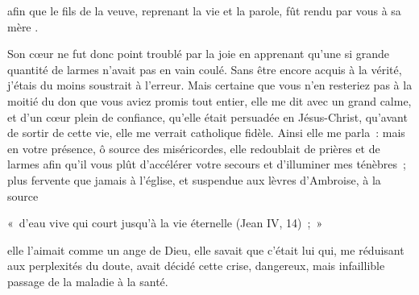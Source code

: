 \documentclass[french,twoside]{book} %
\newenvironment{quoteblock}%
  {\begin{quoting}}
  {\end{quoting}}
\newenvironment{quotebar}{%
    \def\FrameCommand{{\color{rubric!10!}\vrule width 0.5em} \hspace{0.9em}}%
    \def\OuterFrameSep{\itemsep} %
    \MakeFramed {\advance\hsize-\width \FrameRestore}
  }%
  {%
    \endMakeFramed
  }
\renewenvironment{quoteblock}%
  {%
    \savenotes
    \setstretch{0.9}
    \normalfont
    \begin{quotebar}
  }
  {%
    \end{quotebar}
    \spewnotes
  }
\begin{document}
\noindent afin que le fils de la veuve, reprenant la vie et la parole, fût rendu par vous à sa mère .\par
Son cœur ne fut donc point troublé par la joie en apprenant qu’une si grande quantité de larmes n’avait pas en vain coulé. Sans être encore acquis à la vérité, j’étais du moins soustrait à l’erreur. Mais certaine que vous n’en resteriez pas à la moitié du don que vous aviez promis tout entier, elle me dit avec un grand calme, et d’un cœur plein de confiance, qu’elle était persuadée en Jésus-Christ, qu’avant de sortir de cette vie, elle me verrait catholique fidèle. Ainsi elle me parla : mais en votre présence, ô source des miséricordes, elle redoublait de prières et de larmes afin qu’il vous plût d’accélérer votre secours et d’illuminer mes ténèbres ; plus fervente que jamais à l’église, et suspendue aux lèvres d’Ambroise, à la source\par

\begin{quoteblock}
\noindent « d’eau vive qui court jusqu’à la vie éternelle (Jean IV, 14) ; »\end{quoteblock}

\noindent elle l’aimait comme un ange de Dieu, elle savait que c’était lui qui, me réduisant aux perplexités du doute, avait décidé cette crise, dangereux, mais infaillible passage de la maladie à la santé.
\end{document}
